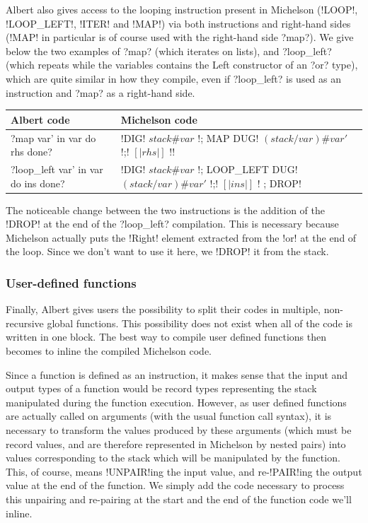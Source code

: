 \documentclass{report}
\begin{document}
Albert also gives access to the looping instruction present in Michelson (!LOOP!, !LOOP_LEFT!, !ITER! and !MAP!) via both instructions and right-hand sides (!MAP! in particular is of course used with the right-hand side ?map?). We give below the two examples of ?map? (which iterates on lists), and ?loop_left? (which repeats while the variables contains the Left constructor of an ?or? type), which are quite similar in how they compile, even if ?loop_left? is used as an instruction and ?map? as a right-hand side.

{\small
\begin{longtable}{p{5cm}|p{11cm}}
  Albert code & Michelson code\\
  \hline
  ?map var' in var do rhs done? & !DIG! $stack\#var$ !; MAP { DUG! $(stack/var)\#var'$ !;! $[|rhs|]$ !}!\\
  \hline
  ?loop_left var' in var do ins done? & !DIG! $stack\#var$ !; LOOP_LEFT { DUG! $(stack/var)\#var'$ !;! $[|ins|]$ !} ; DROP!
\end{longtable}
}

The noticeable change between the two instructions is the addition of the !DROP! at the end of the ?loop_left? compilation. This is necessary because Michelson actually puts the !Right! element extracted from the !or! at the end of the loop. Since we don't want to use it here, we !DROP! it from the stack.

\subsubsection{User-defined functions}
\label{functComp}

Finally, Albert gives users the possibility to split their codes in multiple, non-recursive global functions. This possibility does not exist when all of the code is written in one block. The best way to compile user defined functions then becomes to inline the compiled Michelson code.

Since a function is defined as an instruction, it makes sense that the input and output types of a function would be record types representing the stack manipulated during the function execution. However, as user defined functions are actually called on arguments (with the usual function call syntax), it is necessary to transform the values produced by these arguments (which must be record values, and are therefore represented in Michelson by nested pairs) into values corresponding to the stack which will be manipulated by the function. This, of course, means !UNPAIR!ing the input value, and re-!PAIR!ing the output value at the end of the function. We simply add the code necessary to process this unpairing and re-pairing at the start and the end of the function code we'll inline.\\
\end{document}

